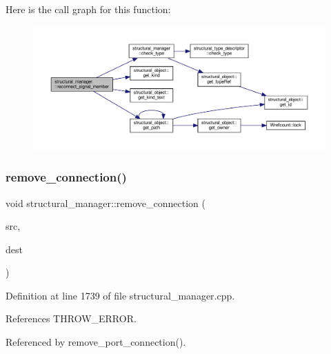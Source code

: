 Here is the call graph for this function\+:
\nopagebreak
\begin{figure}[H]
\begin{center}
\leavevmode
\includegraphics[width=350pt]{d7/d6b/classstructural__manager_a587689c8dff33aaaca72b75199f683ce_cgraph}
\end{center}
\end{figure}
\mbox{\label{classstructural__manager_a5385fbdd2e9ce0f5a50e8d40ede945b2}} 
\subsubsection{\texorpdfstring{remove\+\_\+connection()}{remove\_connection()}}
{\footnotesize\ttfamily void structural\+\_\+manager\+::remove\+\_\+connection (\begin{DoxyParamCaption}\item[{\hyperlink{structural__objects_8hpp_a8ea5f8cc50ab8f4c31e2751074ff60b2}{structural\+\_\+object\+Ref}}]{src,  }\item[{\hyperlink{structural__objects_8hpp_a8ea5f8cc50ab8f4c31e2751074ff60b2}{structural\+\_\+object\+Ref}}]{dest }\end{DoxyParamCaption})}



Definition at line 1739 of file structural\+\_\+manager.\+cpp.



References T\+H\+R\+O\+W\+\_\+\+E\+R\+R\+OR.



Referenced by remove\+\_\+port\+\_\+connection().

